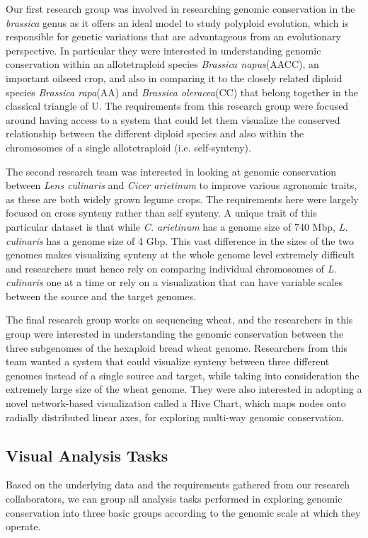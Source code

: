 Our first research group was involved in researching genomic conservation in the \textit{brassica} genus as it offers an ideal model to study polyploid evolution, which is responsible for genetic variations that are advantageous from an evolutionary perspective\cite{madlung2013polyploidy,liu2014brassica}. In particular they were interested in understanding genomic conservation within an allotetraploid species \textit{Brassica napus}(AACC), an important oilseed crop, and also in comparing it to the closely related diploid species \textit{Brassica rapa}(AA) and \textit{Brassica oleracea}(CC) that belong together in the classical triangle of U\cite{nagaharu1935genome}. The requirements from this research group were focused around having access to a system that could let them visualize the conserved relationship between the different diploid species and also within the chromosomes of a single allotetraploid (i.e. self-synteny). 

The second research team was interested in looking at genomic conservation between \textit{Lens culinaris} and \textit{Cicer arietinum} to improve various agronomic traits, as these are both widely grown legume crops. The requirements here were largely focused on cross synteny rather than self synteny. A unique trait of this particular dataset is that while \textit{C. arietinum} has a genome size of 740 Mbp, \textit{L. culinaris} has a genome size of 4 Gbp. This vast difference in the sizes of the two genomes makes visualizing synteny at the whole genome level extremely difficult and researchers must hence rely on comparing individual chromosomes of \textit{L. culinaris} one at a time or rely on a visualization that can have variable scales between the source and the target genomes.


The final research group works on sequencing wheat, and the researchers in this group were interested in understanding the genomic conservation between the three subgenomes of the hexaploid bread wheat genome. Researchers from this team wanted a system that could visualize synteny between three different genomes instead of a single source and target, while taking into consideration the extremely large size of the wheat genome. They were also interested in adopting a novel network-based visualization called a Hive Chart\cite{krzywinski2011hive}, which maps nodes onto radially distributed linear axes, for exploring multi-way genomic conservation.

\subsection{Visual Analysis Tasks}
Based on the underlying data and the requirements gathered from our research collaborators, we can group all analysis tasks performed in exploring genomic conservation into three basic groups according to the genomic scale at which they operate.

